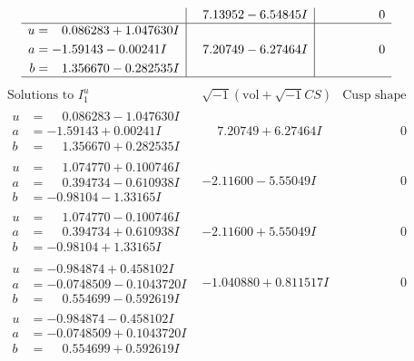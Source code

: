 \documentclass[1p]{elsarticle_modified}
\theoremstyle{definition}
\newcommand{\I}{\sqrt{-1}}
\begin{document}
$$\begin{array}{c|c|c}
 & \phantom{-}7.13952 - 6.54845 I & \phantom{-0.000000 } 0 \\ \hline\begin{aligned}
u &= \phantom{-}0.086283 + 1.047630 I \\
a &= -1.59143 - 0.00241 I \\
b &= \phantom{-}1.356670 - 0.282535 I\end{aligned}
 & \phantom{-}7.20749 - 6.27464 I & \phantom{-0.000000 } 0\\
 \hline 
 \end{array}$$\newpage$$\begin{array}{c|c|c}  
\text{Solutions to }I^u_{1}& \I (\text{vol} + \sqrt{-1}CS) & \text{Cusp shape}\\
 \hline 
\begin{aligned}
u &= \phantom{-}0.086283 - 1.047630 I \\
a &= -1.59143 + 0.00241 I \\
b &= \phantom{-}1.356670 + 0.282535 I\end{aligned}
 & \phantom{-}7.20749 + 6.27464 I & \phantom{-0.000000 } 0 \\ \hline\begin{aligned}
u &= \phantom{-}1.074770 + 0.100746 I \\
a &= \phantom{-}0.394734 - 0.610938 I \\
b &= -0.98104 - 1.33165 I\end{aligned}
 & -2.11600 - 5.55049 I & \phantom{-0.000000 } 0 \\ \hline\begin{aligned}
u &= \phantom{-}1.074770 - 0.100746 I \\
a &= \phantom{-}0.394734 + 0.610938 I \\
b &= -0.98104 + 1.33165 I\end{aligned}
 & -2.11600 + 5.55049 I & \phantom{-0.000000 } 0 \\ \hline\begin{aligned}
u &= -0.984874 + 0.458102 I \\
a &= -0.0748509 - 0.1043720 I \\
b &= \phantom{-}0.554699 - 0.592619 I\end{aligned}
 & -1.040880 + 0.811517 I & \phantom{-0.000000 } 0 \\ \hline\begin{aligned}
u &= -0.984874 - 0.458102 I \\
a &= -0.0748509 + 0.1043720 I \\
b &= \phantom{-}0.554699 + 0.592619 I\end{aligned}

\end{array}$$
\end{document}
